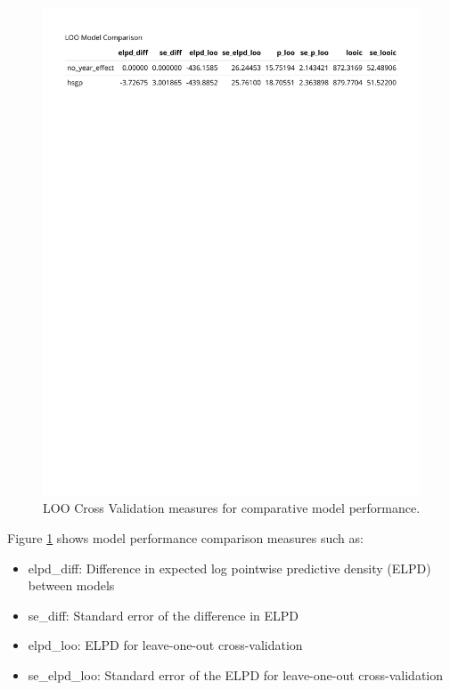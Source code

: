 \documentclass[
]{article}
\providecommand{\tightlist}{%
  \setlength{\itemsep}{0pt}\setlength{\parskip}{0pt}}
\begin{document}
\begin{figure}

{\centering \includegraphics[width=1\linewidth]{../outputs/bayesian-analysis-landfall-freq/best-model-comp} 

}

\caption{LOO Cross Validation measures for comparative model performance.}\label{fig:figs13}
\end{figure}

Figure \ref{fig:figs13} shows model performance comparison measures such as:

\begin{itemize}
\tightlist
\item
  elpd\_diff: Difference in expected log pointwise predictive density (ELPD) between models
\item
  se\_diff: Standard error of the difference in ELPD
\item
  elpd\_loo: ELPD for leave-one-out cross-validation
\item
  se\_elpd\_loo: Standard error of the ELPD for leave-one-out cross-validation
\end{itemize}
\end{document}
